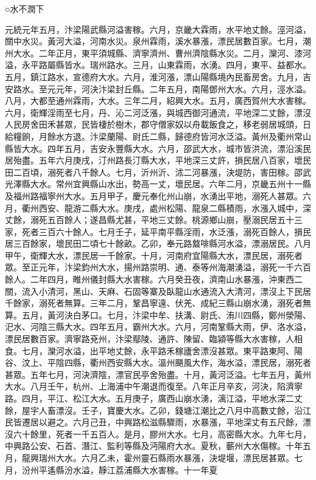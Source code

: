 
\begin{pinyinscope}

 ○水不潤下



 元統元年五月，汴梁陽武縣河溢害稼。六月，京畿大霖雨，水平地丈餘。涇河溢，關中水災。黃河大溢，河南水災。泉州霖雨，溪水暴漲，漂民居數百家。七月，潮州大水。二年正月，東平須城縣、濟寧濟州、曹州濟陰縣水災。二月，灤河、漆河溢，永平路屬縣皆水。瑞州路水。三月，山東霖雨，水湧。四月，東平、益都水。五月，鎮江路水，宣德府大水。六月，淮河漲，漂山陽縣境內民畜房舍。九月，吉安路水。至元元年，河決汴梁封丘縣。二年五月，南陽鄧州大水。六月，涇水溢。八月，大都至通州霖雨，大水。三年二月，紹興大水。五月，廣西賀州大水害稼。六月，衛輝淫雨至七月，丹、沁二河泛漲，與城西御河通流，平地深二丈餘，漂沒人民房舍田禾甚眾，民皆棲於樹木，郡守僧家奴以舟載飯食之，移老弱居城頭，日給糧餉，月餘水方退。汴梁蘭陽、尉氏二縣，歸德府皆河水泛溢。黃州及衢州常山縣皆大水。四年五月，吉安永豐縣大水。六月，邵武大水，城市皆洪流，漂沿溪民居殆盡。五年六月庚戌，汀州路長汀縣大水，平地深三丈許，損民居八百家，壞民田二百頃，溺死者八千餘人。七月，沂州沂、沭二河暴漲，決堤防，害田稼。邵武光澤縣大水。常州宜興縣山水出，勢高一丈，壞民居。六年二月，京畿五州十一縣及福州路福寧州大水。五月甲子，慶元奉化州山崩，水湧出平地，溺死人甚眾。六月，衢州西安、龍游二縣大水。庚戌，處州松陽、龍泉二縣積雨，水漲入城中，深丈餘，溺死五百餘人；遂昌縣尤甚，平地三丈餘。桃源鄉山崩，壓溺民居五十三家，死者三百六十餘人。七月壬子，延平南平縣淫雨，水泛漲，溺死百餘人，損民居三百餘家，壞民田二頃七十餘畝。乙卯，奉元路盩啡縣河水溢，漂溺居民。八月甲午，衛輝大水，漂民居一千餘家。十月，河南府宜陽縣大水，漂民居，溺死者眾。至正元年，汴梁鈞州大水，揚州路崇明、通、泰等州海潮湧溢，溺死一千六百餘人。二年四月，睢州儀封縣大水害稼。六月癸丑夜，濟南山水暴漲，沖東西二關，流入小清河，黑山、天麻、石固等寨及臥龍山水通流入大清河，漂沒上下民居千餘家，溺死者無算。三年二月，鞏昌寧遠、伏羌、成紀三縣山崩水湧，溺死者無算。五月，黃河決白茅口。七月，汴梁中牟、扶溝、尉氏、洧川四縣，鄭州滎陽、汜水、河陰三縣大水。四年五月，霸州大水。六月，河南鞏縣大雨，伊、洛水溢，漂民居數百家。濟寧路兗州，汴梁鄢陵、通許、陳留、臨潁等縣大水害稼，人相食。七月，灤河水溢，出平地丈餘，永平路禾稼廬舍漂沒甚眾。東平路東阿、陽谷、汶上、平陰四縣，衢州西安縣大水。溫州颶風大作，海水溢，漂民居，溺死者甚眾。五年七月，河決濟陰，漂官民亭舍殆盡。十月，黃河泛溢。七年五月，黃州大水。八月壬午，杭州、上海浦中午潮退而復至。八年正月辛亥，河決，陷濟寧路。四月，平江、松江大水。五月庚子，廣西山崩水湧，漓江溢，平地水深二丈餘，屋宇人畜漂沒。壬子，寶慶大水。乙卯，錢塘江潮比之八月中高數丈餘，沿江民皆遷居以避之。六月己丑，中興路松滋縣驟雨，水暴漲，平地深丈有五尺餘，漂沒六十餘里，死者一千五百人。是月，膠州大水。七月，高密縣大水。九年七月，中興路公安、石首、潛江、監利等縣及沔陽府大水。夏秋，蘄州大水傷稼。十年五月，龍興瑞州大水。六月乙未，霍州靈石縣雨水暴漲，決堤堰，漂民居甚眾。七月，汾州平遙縣汾水溢，靜江荔浦縣大水害稼。十一年夏
\end{pinyinscope}
